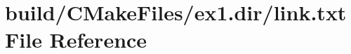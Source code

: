 \hypertarget{ex1_8dir_2link_8txt}{}\section{build/\+C\+Make\+Files/ex1.dir/link.txt File Reference}
\label{ex1_8dir_2link_8txt}
